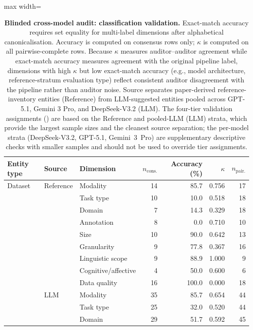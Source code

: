 \begin{table}[H]
\centering
\caption{\textbf{Blinded cross-model audit: classification validation.} Exact-match accuracy requires set equality for multi-label dimensions after alphabetical canonicalisation. Accuracy is computed on consensus rows only; $\kappa$ is computed on all pairwise-complete rows. Because $\kappa$ measures auditor--auditor agreement while exact-match accuracy measures agreement with the original pipeline label, dimensions with high $\kappa$ but low exact-match accuracy (e.g., model architecture, reference-stratum evaluation type) reflect consistent auditor disagreement with the pipeline rather than auditor noise. Source separates paper-derived reference-inventory entities (Reference) from LLM-suggested entities pooled across GPT-5.1, Gemini 3 Pro, and DeepSeek-V3.2 (LLM). The four-tier validation assignments () are based on the Reference and pooled-LLM (LLM) strata, which provide the largest sample sizes and the cleanest source separation; the per-model strata (DeepSeek-V3.2, GPT-5.1, Gemini~3~Pro) are supplementary descriptive checks with smaller samples and should not be used to override tier assignments.}
\label{tab:annotation_classification}
\begin{adjustbox}{max width=\textwidth}
\footnotesize
\begin{tabular}{l l l r r r r}
\toprule
Entity type & Source & Dimension & $n_{\mathrm{cons.}}$ & Accuracy (\%) & $\kappa$ & $n_{\mathrm{pair.}}$ \\
\midrule
Dataset & Reference & Modality & 14 & 85.7 & 0.756 & 17 \\
 &  & Task type & 10 & 10.0 & 0.518 & 18 \\
 &  & Domain & 7 & 14.3 & 0.329 & 18 \\
 &  & Annotation & 8 & 0.0 & 0.710 & 10 \\
 &  & Size & 10 & 90.0 & 0.642 & 13 \\
 &  & Granularity & 9 & 77.8 & 0.367 & 16 \\
 &  & Linguistic scope & 9 & 88.9 & 1.000 & 9 \\
 &  & Cognitive/affective & 4 & 50.0 & 0.600 & 6 \\
 &  & Data quality & 16 & 100.0 & 0.000 & 18 \\
 & LLM & Modality & 35 & 85.7 & 0.654 & 44 \\
 &  & Task type & 25 & 32.0 & 0.520 & 44 \\
 &  & Domain & 29 & 51.7 & 0.592 & 45 \\

\end{tabular}
\end{adjustbox}
\end{table}
